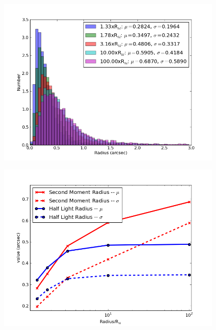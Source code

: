 \documentclass[]{article}
\begin{document}
\begin{figure}
\centering
\includegraphics[width=5in]{validation_figures/Second_moment_hist.png}
\caption{\label{fig:mom_hist}}
\end{figure}
\begin{figure}
\centering
\includegraphics[width=5in]{validation_figures/sec_mom_half_light_mean_sigma.png}
\caption{\label{fig:mom_hl_line}}
\end{figure}
\end{document}
